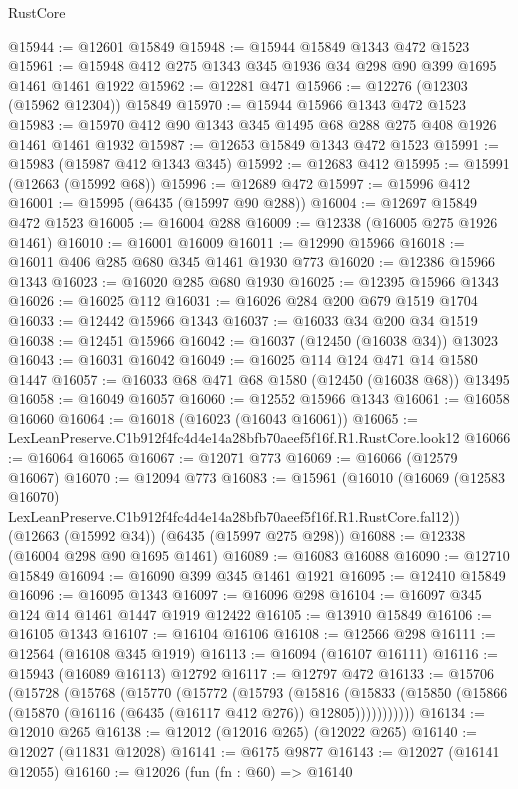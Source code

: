 \begin{lexlean}{RustCore}
\begin{coremodule}
@15944 := @12601 @15849
@15948 := @15944 @15849 @1343 @472 @1523
@15961 := @15948 @412 @275 @1343 @345 @1936 @34 @298 @90 @399 @1695 @1461 @1461 @1922
@15962 := @12281 @471
@15966 := @12276 (@12303 (@15962 @12304)) @15849
@15970 := @15944 @15966 @1343 @472 @1523
@15983 := @15970 @412 @90 @1343 @345 @1495 @68 @288 @275 @408 @1926 @1461 @1461 @1932
@15987 := @12653 @15849 @1343 @472 @1523
@15991 := @15983 (@15987 @412 @1343 @345)
@15992 := @12683 @412
@15995 := @15991 (@12663 (@15992 @68))
@15996 := @12689 @472
@15997 := @15996 @412
@16001 := @15995 (@6435 (@15997 @90 @288))
@16004 := @12697 @15849 @472 @1523
@16005 := @16004 @288
@16009 := @12338 (@16005 @275 @1926 @1461)
@16010 := @16001 @16009
@16011 := @12990 @15966
@16018 := @16011 @406 @285 @680 @345 @1461 @1930 @773
@16020 := @12386 @15966 @1343
@16023 := @16020 @285 @680 @1930
@16025 := @12395 @15966 @1343
@16026 := @16025 @112
@16031 := @16026 @284 @200 @679 @1519 @1704
@16033 := @12442 @15966 @1343
@16037 := @16033 @34 @200 @34 @1519
@16038 := @12451 @15966
@16042 := @16037 (@12450 (@16038 @34)) @13023
@16043 := @16031 @16042
@16049 := @16025 @114 @124 @471 @14 @1580 @1447
@16057 := @16033 @68 @471 @68 @1580 (@12450 (@16038 @68)) @13495
@16058 := @16049 @16057
@16060 := @12552 @15966 @1343
@16061 := @16058 @16060
@16064 := @16018 (@16023 (@16043 @16061))
@16065 := LexLeanPreserve.C1b912f4fc4d4e14a28bfb70aeef5f16f.R1.RustCore.look12
@16066 := @16064 @16065
@16067 := @12071 @773
@16069 := @16066 (@12579 @16067)
@16070 := @12094 @773
@16083 := @15961
    (@16010
      (@16069 (@12583 @16070) LexLeanPreserve.C1b912f4fc4d4e14a28bfb70aeef5f16f.R1.RustCore.fal12))
    (@12663 (@15992 @34))
    (@6435 (@15997 @275 @298))
@16088 := @12338 (@16004 @298 @90 @1695 @1461)
@16089 := @16083 @16088
@16090 := @12710 @15849
@16094 := @16090 @399 @345 @1461 @1921
@16095 := @12410 @15849
@16096 := @16095 @1343
@16097 := @16096 @298
@16104 := @16097 @345 @124 @14 @1461 @1447 @1919 @12422
@16105 := @13910 @15849
@16106 := @16105 @1343
@16107 := @16104 @16106
@16108 := @12566 @298
@16111 := @12564 (@16108 @345 @1919)
@16113 := @16094 (@16107 @16111)
@16116 := @15943 (@16089 @16113) @12792
@16117 := @12797 @472
@16133 := @15706
    (@15728
      (@15768
        (@15770
          (@15772
            (@15793
              (@15816
                (@15833 (@15850 (@15866 (@15870 (@16116 (@6435 (@16117 @412 @276)) @12805)))))))))))
@16134 := @12010 @265
@16138 := @12012 (@12016 @265) (@12022 @265)
@16140 := @12027 (@11831 @12028)
@16141 := @6175 @9877
@16143 := @12027 (@16141 @12055)
@16160 := @12026
    (fun (fn : @60) =>
    @16140

\end{coremodule}
\end{lexlean}
